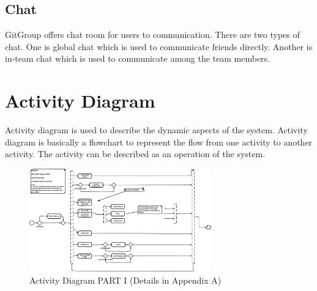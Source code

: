 \documentclass[12pt,a4paper]{report}
\begin{document}
\subsection{Chat}
GitGroup offers chat room for users to communication. There are two types of chat. One is global chat which is used to communicate friends directly. Another is in-team chat which is used to communicate among the team members.

\section{Activity Diagram}
Activity diagram is used to describe the dynamic aspects of the system. Activity diagram is basically a flowchart to represent the flow from one activity to another activity. The activity can be described as an operation of the system.
\begin{figure}[H]
	\centering
	\includegraphics[width=0.7\textwidth]{./pics/ActivatyDiagramPARTI.png}
	\caption{Activity Diagram PART I (Details in Appendix A)}
\end{figure}
\end{document}
